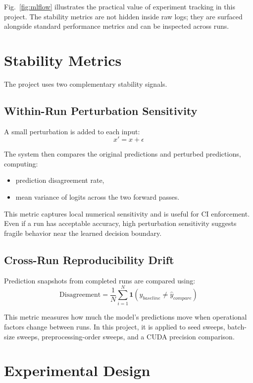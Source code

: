 \documentclass[conference]{IEEEtran}
\begin{document}
Fig.~\ref{fig:mlflow} illustrates the practical value of experiment tracking in this project. The stability metrics are not hidden inside raw logs; they are surfaced alongside standard performance metrics and can be inspected across runs.

\section{Stability Metrics}

The project uses two complementary stability signals.

\subsection{Within-Run Perturbation Sensitivity}

A small perturbation is added to each input:
\begin{equation}
x' = x + \epsilon
\end{equation}

The system then compares the original predictions and perturbed predictions, computing:
\begin{itemize}
\item prediction disagreement rate,
\item mean variance of logits across the two forward passes.
\end{itemize}

This metric captures local numerical sensitivity and is useful for CI enforcement. Even if a run has acceptable accuracy, high perturbation sensitivity suggests fragile behavior near the learned decision boundary.

\subsection{Cross-Run Reproducibility Drift}

Prediction snapshots from completed runs are compared using:
\begin{equation}
\text{Disagreement} =
\frac{1}{N}\sum_{i=1}^{N}\mathbf{1}\left(\hat{y}_{baseline}\neq\hat{y}_{compare}\right)
\end{equation}

This metric measures how much the model's predictions move when operational factors change between runs. In this project, it is applied to seed sweeps, batch-size sweeps, preprocessing-order sweeps, and a CUDA precision comparison.

\section{Experimental Design}
\end{document}
